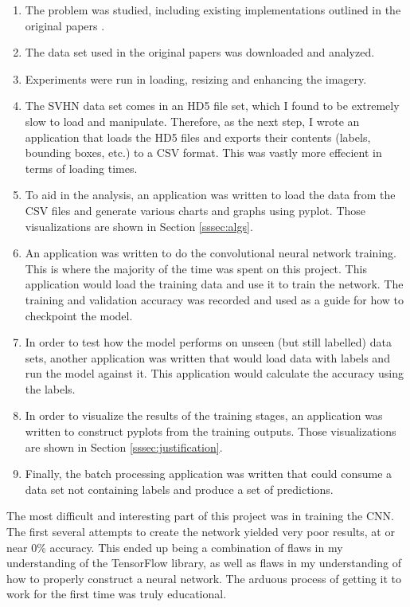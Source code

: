 \documentclass[12pt]{article}
\begin{document}
\begin{enumerate}
\item The problem was studied, including existing implementations outlined in the original papers \cite{svhn_original_paper,svhn_lrn}.
\item The data set used in the original papers was downloaded and analyzed.
\item Experiments were run in loading, resizing and enhancing the imagery. 
\item The SVHN data set comes in an HD5 file set, which I found to be extremely slow to load and manipulate. Therefore, as the next step, I wrote an application that loads the HD5 files and exports their contents (labels, bounding boxes, etc.) to a CSV format. This was vastly more effecient in terms of loading times.
\item To aid in the analysis, an application was written to load the data from the CSV files and generate various charts and graphs using pyplot. Those visualizations are shown in Section \ref{sssec:algs}.
\item An application was written to do the convolutional neural network training. This is where the majority of the time was spent on this project. This application would load the training data and use it to train the network. The training and validation accuracy was recorded and used as a guide for how to checkpoint the model.
\item In order to test how the model performs on unseen (but still labelled) data sets, another application was written that would load data with labels and run the model against it. This application would calculate the accuracy using the labels.
\item In order to visualize the results of the training stages, an application was written to construct pyplots from the training outputs. Those visualizations are shown in Section \ref{sssec:justification}.
\item Finally, the batch processing application was written that could consume a data set not containing labels and produce a set of predictions.
\end{enumerate}

The most difficult and interesting part of this project was in training the CNN. 
The first several attempts to create the network yielded very poor results, at or near 0\% accuracy.
This ended up being a combination of flaws in my understanding of the TensorFlow library, as well as flaws in my understanding of how to properly construct a neural network.
The arduous process of getting it to work for the first time was truly educational.
\end{document}
